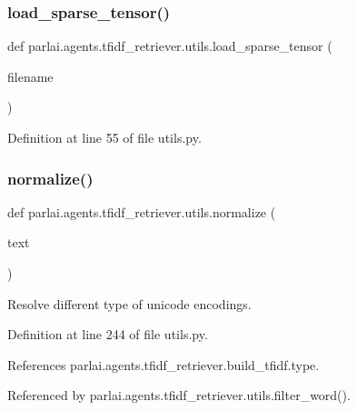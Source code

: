 \subsubsection{\texorpdfstring{load\+\_\+sparse\+\_\+tensor()}{load\_sparse\_tensor()}}
{\footnotesize\ttfamily def parlai.\+agents.\+tfidf\+\_\+retriever.\+utils.\+load\+\_\+sparse\+\_\+tensor (\begin{DoxyParamCaption}\item[{}]{filename }\end{DoxyParamCaption})}



Definition at line 55 of file utils.\+py.

\mbox{\label{namespaceparlai_1_1agents_1_1tfidf__retriever_1_1utils_ace97d2139f74e163a7ba81fcfb505f1c}} 
\subsubsection{\texorpdfstring{normalize()}{normalize()}}
{\footnotesize\ttfamily def parlai.\+agents.\+tfidf\+\_\+retriever.\+utils.\+normalize (\begin{DoxyParamCaption}\item[{}]{text }\end{DoxyParamCaption})}

\begin{DoxyVerb}Resolve different type of unicode encodings.\end{DoxyVerb}
 

Definition at line 244 of file utils.\+py.



References parlai.\+agents.\+tfidf\+\_\+retriever.\+build\+\_\+tfidf.\+type.



Referenced by parlai.\+agents.\+tfidf\+\_\+retriever.\+utils.\+filter\+\_\+word().

